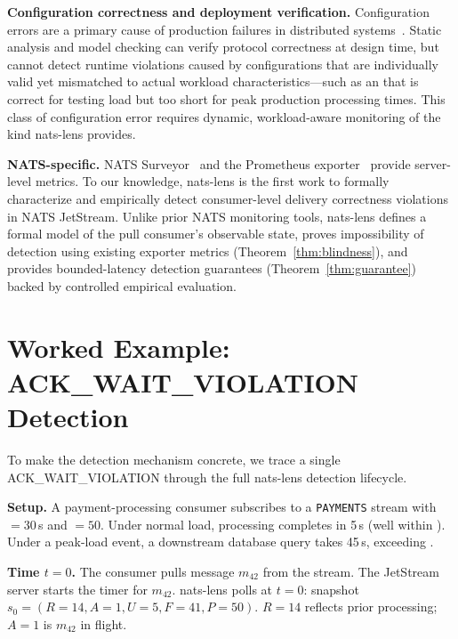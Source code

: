 \documentclass[journal]{IEEEtran}
\begin{document}
\textbf{Configuration correctness and deployment verification.}
Configuration errors are a primary cause of production failures in
distributed systems~\cite{configerrors,misconfig-study}.
Static analysis and model checking can verify protocol correctness at
design time, but cannot detect runtime violations caused by configurations
that are individually valid yet mismatched to actual workload
characteristics---such as an  that is correct for testing
load but too short for peak production processing times.
This class of configuration error requires dynamic, workload-aware
monitoring of the kind nats-lens provides.

\textbf{NATS-specific.}
NATS Surveyor~\cite{surveyor} and the Prometheus exporter~\cite{prometheus-nats}
provide server-level metrics. To our knowledge, nats-lens is the first work
to formally characterize and empirically detect consumer-level delivery
correctness violations in NATS JetStream.
Unlike prior NATS monitoring tools, nats-lens defines a formal model of
the pull consumer's observable state, proves impossibility of detection
using existing exporter metrics (Theorem~\ref{thm:blindness}), and
provides bounded-latency detection guarantees (Theorem~\ref{thm:guarantee})
backed by controlled empirical evaluation.

\section{Worked Example: ACK\_WAIT\_VIOLATION Detection}
\label{sec:example}

To make the detection mechanism concrete, we trace a single
ACK\_WAIT\_VIOLATION through the full nats-lens detection lifecycle.

\textbf{Setup.} A payment-processing consumer subscribes to a
\texttt{PAYMENTS} stream with $=30$\,s and
$=50$. Under normal load, processing completes
in 5\,s (well within ). Under a peak-load event, a
downstream database query takes 45\,s, exceeding .

\textbf{Time $t=0$.} The consumer pulls message $m_{42}$ from the stream.
The JetStream server starts the  timer for $m_{42}$.
nats-lens polls at $t=0$: snapshot $s_0 = (R=14, A=1, U=5, F=41, P=50)$.
$R=14$ reflects prior processing; $A=1$ is $m_{42}$ in flight.
\end{document}
